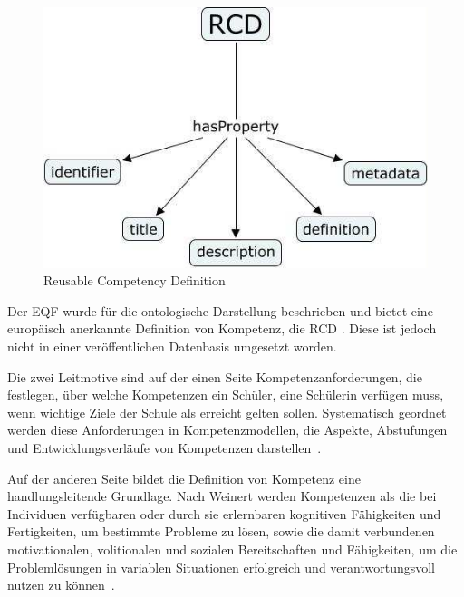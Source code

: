 \documentclass[
12pt,
english,
ngerman,
headsepline,
twoside,
openright,
numbers=noenddot,version=first
]{scrreprt}
\begin{document}
\begin{figure}
	\includegraphics[width=0.9\linewidth]{pics/RCD.jpg}
	\caption{Reusable Competency Definition}
\end{figure}

Der \acrshort{EQF} wurde für die ontologische Darstellung beschrieben und bietet eine europäisch anerkannte Definition von Kompetenz, die \acrfull{RCD} \cite{eqfCompetency}. Diese ist jedoch nicht in einer veröffentlichen Datenbasis umgesetzt worden.



Die zwei Leitmotive sind auf der einen Seite Kompetenzanforderungen, \glqq die festlegen, über welche Kompetenzen ein Schüler, eine Schülerin verfügen muss, wenn wichtige Ziele der Schule als erreicht gelten sollen. Systematisch geordnet werden diese Anforderungen in Kompetenzmodellen, die Aspekte, Abstufungen und Entwicklungsverläufe von Kompetenzen darstellen\grqq\ \cite{competence}. 

Auf der anderen Seite bildet die Definition von \Gls{Kompetenz} eine handlungsleitende Grundlage. Nach Weinert werden Kompetenzen als \glqq die bei Individuen verfügbaren oder durch sie erlernbaren kognitiven Fähigkeiten und Fertigkeiten, um bestimmte Probleme zu lösen, sowie die damit verbundenen motivationalen, volitionalen und sozialen Bereitschaften und Fähigkeiten, um die Problemlösungen in variablen Situationen erfolgreich und verantwortungsvoll nutzen zu können\grqq\ \cite{weinert2002leistungsmessungen}.
\end{document}
